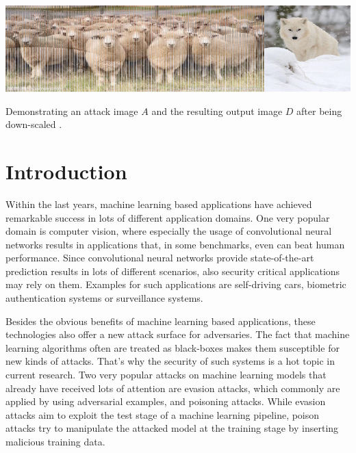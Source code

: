 \documentclass[sigconf]{acmart}
\begin{document}


\begin{teaserfigure}
  \includegraphics[width=\textwidth]{teaser.png}
  \caption{Demonstrating an attack image $A$ and the resulting output image $D$ after being down-scaled \cite{camouflage}.}
  \label{fig:teaser}
\end{teaserfigure}

\maketitle

\section{Introduction}
Within the last years, machine learning based applications have achieved remarkable success in lots of different application domains.
One very popular domain is computer vision, where especially the usage of convolutional neural networks results in applications that, in some benchmarks, even can beat human performance.
Since convolutional neural networks provide state-of-the-art prediction results in lots of different scenarios, also security critical applications may rely on them.
Examples for such applications are self-driving cars, biometric authentication systems or surveillance systems.

Besides the obvious benefits of machine learning based applications, these technologies also offer a new attack surface for adversaries.
The fact that machine learning algorithms often are treated as black-boxes makes them susceptible for new kinds of attacks.
That's why the security of such systems is a hot topic in current research.
Two very popular attacks on machine learning models that already have received lots of attention are evasion attacks, which commonly are applied by using adversarial examples, and poisoning attacks.
While evasion attacks aim to exploit the test stage of a machine learning pipeline, poison attacks try to manipulate the attacked model at the training stage by inserting malicious training data.
\end{document}
